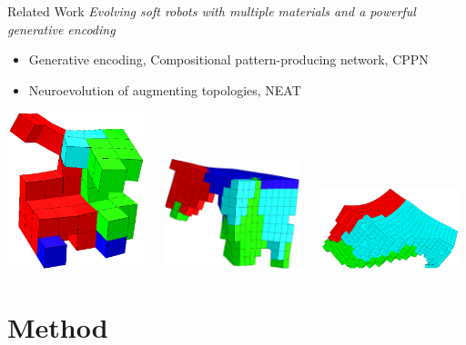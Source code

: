 \documentclass[6pt]{beamer}
\begin{document}
\begin{frame}{Related Work}
\textit{Evolving soft robots with multiple materials and a powerful generative encoding}~
\begin{itemize}
\item Generative encoding, Compositional pattern-producing network, CPPN
\item Neuroevolution of augmenting topologies, NEAT
\end{itemize}
\vspace{0.3cm}
\includegraphics[width=0.3\textwidth,height=0.25\textheight]{../Figures/Misc/unshacklingEvolutionFigure1.png}\	\	\	
\includegraphics[width=0.3\textwidth,height=0.25\textheight]{../Figures/Misc/unshacklingEvolutionFigure2.png}\	\	\	
\includegraphics[width=0.3\textwidth,height=0.25\textheight]{../Figures/Misc/unshacklingEvolutionFigure3.png}\\[0.8cm]
\end{frame}









\section{Method}
\end{document}
